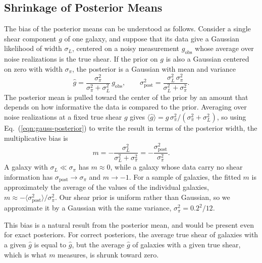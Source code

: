 \subsection{Shrinkage of Posterior Means}
\label{ssec:shrinkage}

The bias of the posterior means can be understood as follows. Consider a single shear component $g$ of one galaxy, and suppose that its data give a Gaussian likelihood of width $\sigma_L$, centered on a noisy measurement $g_\mathrm{obs}$ whose average over noise realizations is the true shear. If the prior on $g$ is also a Gaussian centered on zero with width $\sigma_\pi$, the posterior is a Gaussian with mean and variance
\begin{equation}
\label{eqn:gauss-posterior}
    \hat{g} = \frac{\sigma_\pi^2}{\sigma_\pi^2 + \sigma_L^2}\, g_\mathrm{obs}, \qquad
    \sigma_\mathrm{post}^2 = \frac{\sigma_L^2\, \sigma_\pi^2}{\sigma_L^2 + \sigma_\pi^2}.
\end{equation}
The posterior mean is pulled toward the center of the prior by an amount that depends on how informative the data is compared to the prior. Averaging over noise realizations at a fixed true shear $g$ gives $\langle \hat{g} \rangle = g\,\sigma_\pi^2/(\sigma_\pi^2 + \sigma_L^2)$, so using Eq.~(\ref{eqn:gauss-posterior}) to write the result in terms of the posterior width, the multiplicative bias is
\begin{equation}
\label{eqn:shrinkage}
    m = -\frac{\sigma_L^2}{\sigma_L^2 + \sigma_\pi^2} = -\frac{\sigma_\mathrm{post}^2}{\sigma_\pi^2}.
\end{equation}
A galaxy with $\sigma_L \ll \sigma_\pi$ has $m \approx 0$, while a galaxy whose data carry no shear information has $\sigma_\mathrm{post} \to \sigma_\pi$ and $m \to -1$. For a sample of galaxies, the fitted $m$ is approximately the average of the values of the individual galaxies, $m \approx -\langle \sigma_\mathrm{post}^2 \rangle / \sigma_\pi^2$. Our shear prior is uniform rather than Gaussian, so we approximate it by a Gaussian with the same variance, $\sigma_\pi^2 = 0.2^2/12$.

This bias is a natural result from the posterior mean, and would be present even for exact posteriors. For correct posteriors, the average true shear of galaxies with a given $\hat{g}$ is equal to $\hat{g}$, but the average $\hat{g}$ of galaxies with a given true shear, which is what $m$ measures, is shrunk toward zero.

